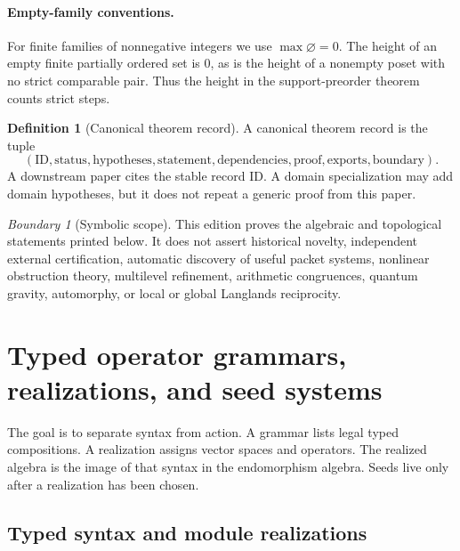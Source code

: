 \documentclass[11pt]{article}
\theoremstyle{definition}
\newtheorem{definition}[definition]{Definition}
\theoremstyle{remark}
\newtheorem{boundary}[boundary]{Boundary}
\theoremstyle{definition}\newtheorem{example}[theorem]{Example}
\newcommand{\RecordID}[1]{\label{record:#1}}
\begin{document}
\paragraph{Empty-family conventions.} For finite families of nonnegative integers we use $\max\varnothing=0$. The height of an empty finite partially ordered set is $0$, as is the height of a nonempty poset with no strict comparable pair. Thus the height in the support-preorder theorem counts strict steps.

\begin{definition}[Canonical theorem record]
\label{def:theorem-record}
A canonical theorem record is the tuple
\[
(\mathrm{ID},\mathrm{status},\mathrm{hypotheses},\mathrm{statement},
\mathrm{dependencies},\mathrm{proof},\mathrm{exports},\mathrm{boundary}).
\]
A downstream paper cites the stable record ID.  A domain specialization may add domain hypotheses, but it does not repeat a generic proof from this paper.
\end{definition}
\RecordID{PSC-I-D-THEOREM-RECORD}

\begin{boundary}[Symbolic scope]
\label{bnd:symbolic-scope}
This edition proves the algebraic and topological statements printed below.  It does not assert historical novelty, independent external certification, automatic discovery of useful packet systems, nonlinear obstruction theory, multilevel refinement, arithmetic congruences, quantum gravity, automorphy, or local or global Langlands reciprocity.
\end{boundary}
\RecordID{PSC-I-B-SYMBOLIC-SCOPE}

\section{Typed operator grammars, realizations, and seed systems}
\begin{readerroadmap}
The goal is to separate syntax from action.  A grammar lists legal typed compositions.  A realization assigns vector spaces and operators.  The realized algebra is the image of that syntax in the endomorphism algebra.  Seeds live only after a realization has been chosen.
\end{readerroadmap}
\subsection{Typed syntax and module realizations}
\end{document}
